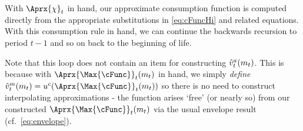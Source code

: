 \documentclass[SolvingMicroDSOPs]{subfiles}
\begin{document}
With $\Aprx{\chi}_{\prd}$ in hand, our approximate consumption function
is computed directly from the appropriate substitutions in \eqref{eq:cFuncHi}
and related equations.  With this consumption
rule in hand, we can continue the backwards recursion to period $t-1$
and so on back to the beginning of life.

Note that this loop does not contain an item for constructing $\hat{v}_{t}^{a}(m_{t})$. This is because with $\Aprx{\Max{\cFunc}}_{\prd}(m_{\prd})$ in hand, we simply \textit{define} $\hat{\vFunc}^{m}_{\prd}(m_{\prd}) = \uFunc^{c}(\Aprx{\Max{\cFunc}}_{\prd}(m_{\prd}))$ so there is no need to construct interpolating approximations - the function arises `free' (or nearly so) from our constructed $\Aprx{\Max{\cFunc}}_{\prd}(m_{\prd})$ via the usual envelope result (cf.\ \eqref{eq:envelope}).
\end{document}
